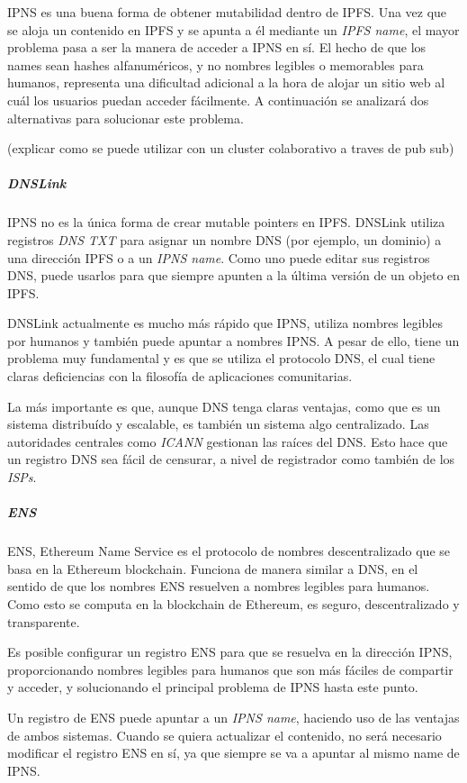 IPNS es una buena forma de obtener mutabilidad dentro de IPFS. Una vez que se aloja un contenido en IPFS y se apunta a él mediante un \textit{IPFS name}, el mayor problema pasa a ser la manera de acceder a IPNS en sí. El hecho de que los names sean hashes alfanuméricos, y no nombres legibles o memorables para humanos, representa una dificultad adicional a la hora de alojar un sitio web al cuál los usuarios puedan acceder fácilmente. A continuación se analizará dos alternativas para solucionar este problema.

(explicar como se puede utilizar con un cluster colaborativo a traves de pub sub)

\subparagraph{DNSLink}

IPNS no es la única forma de crear mutable pointers en IPFS. DNSLink \cite{dnslink} utiliza registros \textit{DNS TXT} para asignar un nombre DNS (por ejemplo, un dominio) a una dirección IPFS o a un \textit{IPNS name}. Como uno puede editar sus registros DNS, puede usarlos para que siempre apunten a la última versión de un objeto en IPFS.

DNSLink actualmente es mucho más rápido que IPNS, utiliza nombres legibles por humanos y también puede apuntar a nombres IPNS. A pesar de ello, tiene un problema muy fundamental y es que se utiliza el protocolo DNS, el cual tiene claras deficiencias con la filosofía de aplicaciones comunitarias.

La más importante es que, aunque DNS tenga claras ventajas, como que es un sistema distribuído y escalable, es también un sistema algo centralizado. Las autoridades centrales como \textit{ICANN} gestionan las raíces del DNS. Esto hace que un registro DNS sea fácil de censurar, a nivel de registrador como también de los \textit{ISPs}.

\subparagraph{ENS}

ENS, Ethereum Name Service es el protocolo de nombres descentralizado que se basa en la Ethereum blockchain. Funciona de manera similar a DNS, en el sentido de que los nombres ENS resuelven a nombres legibles para humanos. Como esto se computa en la blockchain de Ethereum, es seguro, descentralizado y transparente.

Es posible configurar un registro ENS para que se resuelva en la dirección IPNS, proporcionando nombres legibles para humanos que son más fáciles de compartir y acceder, y solucionando el principal problema de IPNS hasta este punto.

Un registro de ENS puede apuntar a un \textit{IPNS name}, haciendo uso de las ventajas de ambos sistemas. Cuando se quiera actualizar el contenido, no será necesario modificar el registro ENS en sí, ya que siempre se va a apuntar al mismo name de IPNS.

